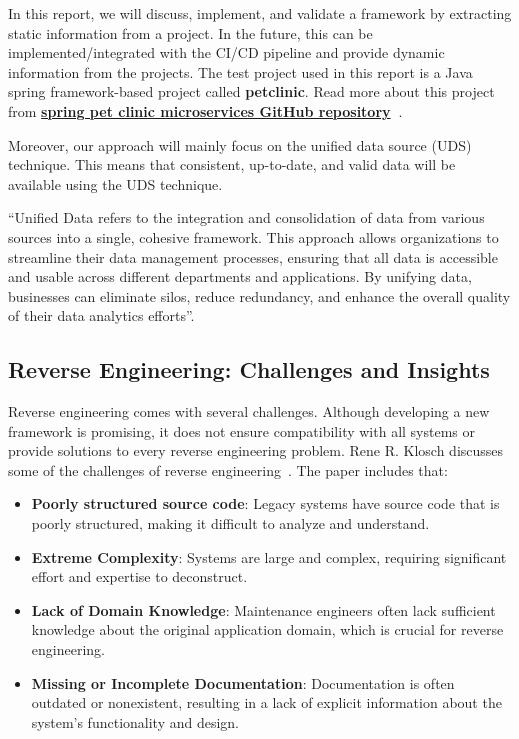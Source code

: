 In this report, we will discuss, implement, and validate a framework by extracting static information from a project. In the future, this can be implemented/integrated with the CI/CD pipeline and provide dynamic information from the projects. The test project used in this report is a Java spring framework-based project called \textbf{petclinic}. Read more about this project from \textbf{\href{https://github.com/spring-petclinic/spring-petclinic-microservices} {spring pet clinic microservices GitHub repository}~\citep{spring-petclinic}}.

Moreover, our approach will mainly focus on the unified data source (UDS) technique. This means that consistent, up-to-date, and valid data will be available using the UDS technique. 

\begin{tcolorbox}[colback=gray!10, colframe=gray!20]
	``Unified Data refers to the integration and consolidation of data from various sources into a single, cohesive framework. This approach allows organizations to streamline their data management processes, ensuring that all data is accessible and usable across different departments and applications. By unifying data, businesses can eliminate silos, reduce redundancy, and enhance the overall quality of their data analytics efforts''.~\citep{unifiedData2025}
\end{tcolorbox}

\subsection{Reverse Engineering: Challenges and Insights}
Reverse engineering comes with several challenges. Although developing a new framework is promising, it does not ensure compatibility with all systems or provide solutions to every reverse engineering problem. Rene R. Klosch discusses some of the challenges of reverse engineering~\citep{klosch1996reverse}. The paper includes that:
\begin{itemize}[label=$\bullet$]
	\item \textbf{Poorly structured source code}: Legacy systems have source code that is poorly structured, making it difficult to analyze and understand.
	\item \textbf{Extreme Complexity}: Systems are large and complex, requiring significant effort and expertise to deconstruct.
	\item \textbf{Lack of Domain Knowledge}: Maintenance engineers often lack sufficient knowledge about the original application domain, which is crucial for reverse engineering.
	\item \textbf{Missing or Incomplete Documentation}: Documentation is often outdated or nonexistent, resulting in a lack of explicit information about the system's functionality and design.
\end{itemize}


